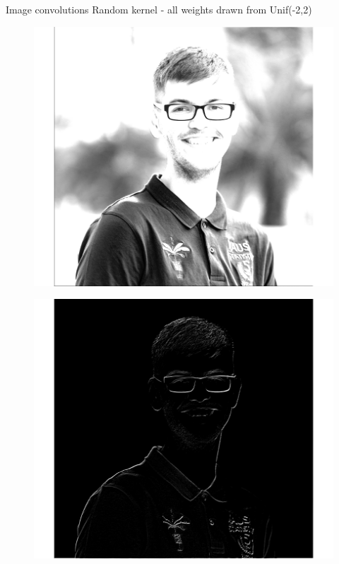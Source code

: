 \documentclass{beamer}
\begin{document}
\begin{frame}{Image convolutions}
Random kernel - all weights drawn from Unif(-2,2)

\begin{minipage}{0.24\linewidth}
\begin{figure}
\includegraphics[width=\linewidth]{Images/conv11.png}
\end{figure}

\end{minipage}
\begin{minipage}{0.24\linewidth}
\begin{figure}
\includegraphics[width=\linewidth]{Images/conv12.png}
\end{figure}


\end{minipage}
\end{frame}
\end{document}
